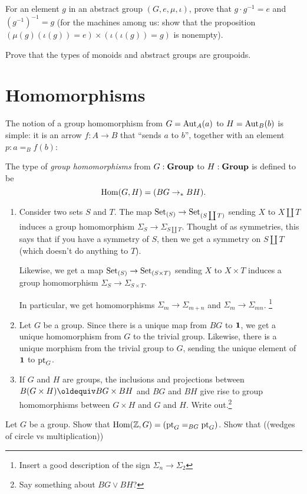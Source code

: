   \begin{xca}
    For an element $g$ in an abstract group $(G,e,\mu,\iota)$, prove that $g\cdot g^{-1}=e$ and $(g^{-1})^{-1}=g$ (for the machines among us: show that the proposition
$
(\mu{}(g)(\iota{}(g))=e)\times
(\iota{}(\iota{}(g))=g)$ is nonempty).
  \end{xca}
  \begin{xca}\label{xca:typemonoidisgroupoid}
    Prove that the types of monoids and abstract groups are groupoids.
  \end{xca}



\section{Homomorphisms}
\label{sec:homomorphisms}


The notion of a group homomorphism from $G=\mathrm{Aut}_A(a)$ to $H=\mathrm{Aut}_B(b)$ is simple: it is an arrow $f:A\to B$ that ``sends $a$ to $b$'', \ie together with an element $p:a=_Bf(b)$:
\begin{definition}\label{def:grouphomomorphism}
  The type of \emph{group homomorphisms} from $G:\mathbf{Group}$ to $H:\mathbf{Group}$ is defined to be
$$\Hom(G,H)=(BG\to_* BH).%
$$
\end{definition}
\begin{example}
  \begin{enumerate}
  \item   Consider two sets $S$ and $T$.  The map $\mathord{\mathrm{Set}}_{(S)}\to\mathord{\mathrm{Set}}_{(S\coprod T)}$ sending $X$ to $X\coprod T$ induces a group homomorphism $\Sigma_S\to\Sigma_{S\coprod T}$.
Thought of as symmetries, this says that if you have a symmetry of $S$, then we get a symmetry on $S\coprod T$ (which doesn't do anything to $T$).  

Likewise, we get a map $\mathord{\mathrm{Set}}_{(S)}\to\mathord{\mathrm{Set}}_{(S\times T)}$ sending $X$ to $X\times T$ induces a group homomorphism $\Sigma_S\to\Sigma_{S\times T}$. 

In particular, we get homomorphisms $\Sigma_m\to\Sigma_{m+n}$ and $\Sigma_m\to\Sigma_{mn}$. \footnote{Insert a good description of the sign $\Sigma_n\to\Sigma_2$}
\item Let $G$ be a group.  Since there is a unique map from $BG$ to $\mathbf{1} $, we get a unique homomorphism from $G$ to the trivial group.  Likewise, there is a unique morphism from the trivial group to $G$, sending the unique element of $\mathbf{1}$ to ${\mathord{\mathrm{pt}}}_G$. 
\item If $G$ and $H$ are groups, the inclusions and projections between $B(G\times H)\oldequiv BG\times BH$ and $BG$ and $BH$ give rise to group homomorphisms between $G\times H$ and $G$ and $H$.  Write out.\footnote{Say something about $BG\vee BH$?}
  \end{enumerate}
\end{example}
\begin{xca}
  Let $G$ be a group.  Show that $\mathrm{Hom}(\mathbb{Z},G)=({\mathord{\mathrm{pt}}}_G=_{BG}{\mathord{\mathrm{pt}}}_G)$.  Show that ((wedges of circle vs multiplication))
\end{xca}

